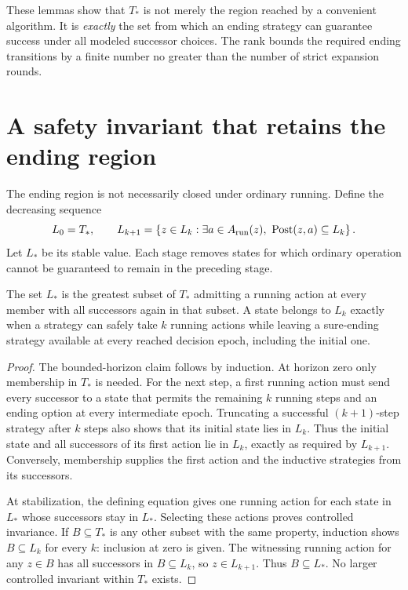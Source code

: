 These lemmas show that $T_*$ is not merely the region reached by a convenient algorithm. It is \emph{exactly} the set from which an ending strategy can guarantee success under all modeled successor choices. The rank bounds the required ending transitions by a finite number no greater than the number of strict expansion rounds.

\section{A safety invariant that retains the ending region}
The ending region is not necessarily closed under ordinary running. Define the decreasing sequence
\[
L_0=T_*,\qquad
L_{k+1}=\left\{z\in L_k:\exists a\in A_{\rm run}(z),\ \operatorname{Post}(z,a)\subseteq L_k\right\}.
\]
Let $L_*$ be its stable value. Each stage removes states for which ordinary operation cannot be guaranteed to remain in the preceding stage.

\begin{Corelemma}\label{Core:r:running-invariant}
The set $L_*$ is the greatest subset of $T_*$ admitting a running action at every member with all successors again in that subset. A state belongs to $L_k$ exactly when a strategy can safely take $k$ running actions while leaving a sure-ending strategy available at every reached decision epoch, including the initial one.
\end{Corelemma}
\begin{proof}
The bounded-horizon claim follows by induction. At horizon zero only membership in $T_*$ is needed. For the next step, a first running action must send every successor to a state that permits the remaining $k$ running steps and an ending option at every intermediate epoch. Truncating a successful $(k+1)$-step strategy after $k$ steps also shows that its initial state lies in $L_k$. Thus the initial state and all successors of its first action lie in $L_k$, exactly as required by $L_{k+1}$. Conversely, membership supplies the first action and the inductive strategies from its successors.

At stabilization, the defining equation gives one running action for each state in $L_*$ whose successors stay in $L_*$. Selecting these actions proves controlled invariance. If $B\subseteq T_*$ is any other subset with the same property, induction shows $B\subseteq L_k$ for every $k$: inclusion at zero is given. The witnessing running action for any $z\in B$ has all successors in $B\subseteq L_k$, so $z\in L_{k+1}$. Thus $B\subseteq L_*$. No larger controlled invariant within $T_*$ exists.
\end{proof}

